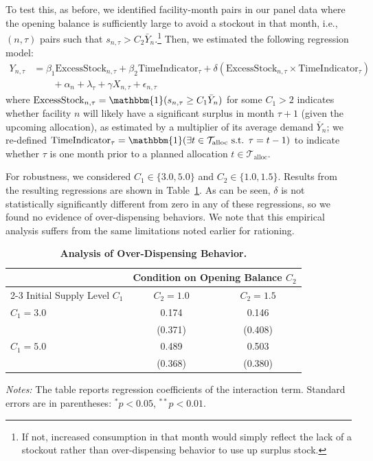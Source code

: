 \documentclass[12pt]{article}
\begin{document}
To test this, as before, we identified facility-month pairs in our panel data where the opening balance is sufficiently large to avoid a stockout in that month, i.e., $(n,\tau)$ pairs such that $s_{n,\tau}>C_2\bar{Y}_n$.\footnote{If not, increased consumption in that month would simply reflect the lack of a stockout rather than over-dispensing behavior to use up surplus stock.} Then, we estimated the following regression model:
\begin{align}
\label{eqn:excessspec}
Y_{n,\tau} &= \beta_1 \text{ExcessStock}_{n,\tau} + \beta_2 \text{TimeIndicator}_\tau
+ \delta (\text{ExcessStock}_{n,\tau} \times \text{TimeIndicator}_\tau) \nonumber\\
&\qquad+ \alpha_n + \lambda_\tau + \gamma X_{n,\tau} + \epsilon_{n,\tau}
\end{align}
where $\text{ExcessStock}_{n,\tau}=\mathbbm{1}(s_{n,\tau}\ge C_1\bar{Y}_n)$ for some $C_1 > 2$ indicates whether facility $n$ will likely have a significant surplus in month $\tau+1$ (given the upcoming allocation), as estimated by a multiplier of its average demand $\bar{Y}_n$; we re-defined $\text{TimeIndicator}_{\tau}=\mathbbm{1}(\exists t\in\mathcal{T}_{\text{alloc}}\text{ s.t. }\tau=t-1)$ to indicate whether $\tau$ is one month prior to a planned allocation $t\in\mathcal{T}_{\text{alloc}}$.

For robustness, we considered $C_1\in\{3.0,5.0\}$ and $C_2\in\{1.0,1.5\}$. Results from the resulting regressions are shown in Table~\ref{tab:oversupply_interaction}. As can be seen, $\delta$ is not statistically significantly different from zero in any of these regressions, so we found no evidence of over-dispensing behaviors. We note that this empirical analysis suffers from the same limitations noted earlier for rationing.

\begin{table}[t]
\caption{\textbf{Analysis of Over-Dispensing Behavior.}}
\label{tab:oversupply_interaction}
\centering
\begin{threeparttable}
\begin{tabular}{lcc}
\toprule
& \multicolumn{2}{c}{Condition on Opening Balance $C_2$} \\
\cmidrule(lr){2-3}
Initial Supply Level $C_1$ & $C_2=1.0$ & $C_2=1.5$ \\
\midrule
$C_1=3.0$ & 0.174 & 0.146 \\
     & (0.371) & (0.408) \\
\addlinespace
$C_1=5.0$ & 0.489 & 0.503 \\
     & (0.368) & (0.380) \\
\bottomrule
\end{tabular}
\begin{tablenotes}
[flushleft]
\footnotesize
\item \textit{Notes:} The table reports regression coefficients of the interaction term. Standard errors are in parentheses: $^{*} p < 0.05$, $^{**} p < 0.01$.
\end{tablenotes}
\end{threeparttable}
\end{table}
\end{document}
